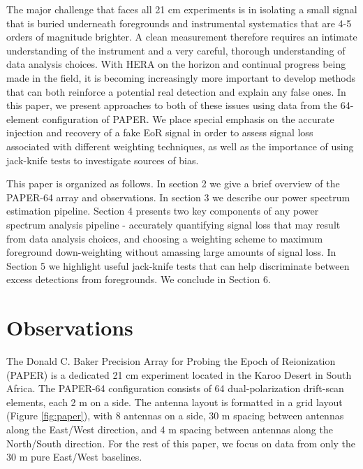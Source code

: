 \documentclass[preprint2,numberedappendix,tighten,twocolappendix]{aastex6}  %
\begin{document}
The major challenge that faces all 21 cm experiments is in isolating a small signal that is buried underneath foregrounds and instrumental systematics that are 4-5 orders of magnitude brighter. A clean measurement therefore requires an intimate understanding of the instrument and a very careful, thorough understanding of data analysis choices. With HERA on the horizon and continual progress being made in the field, it is becoming increasingly more important to develop methods that can both reinforce a potential real detection and explain any false ones. In this paper, we present approaches to both of these issues using data from the 64-element configuration of PAPER. We place special emphasis on the accurate injection and recovery of a fake EoR signal in order to assess signal loss associated with different weighting techniques, as well as the importance of using jack-knife tests to investigate sources of bias.

This paper is organized as follows. In section 2 we give a brief overview of the PAPER-64 array and observations. In section 3 we describe our power spectrum estimation pipeline. Section 4 presents two key components of any power spectrum analysis pipeline - accurately quantifying signal loss that may result from data analysis choices, and choosing a weighting scheme to maximum foreground down-weighting without amassing large amounts of signal loss. In Section 5 we highlight useful jack-knife tests that can help discriminate between excess detections from foregrounds. We conclude in Section 6.

\section{Observations}
\label{sec:Obs}

The Donald C. Baker Precision Array for Probing the Epoch of Reionization (PAPER) is a dedicated 21 cm experiment located in the Karoo Desert in South Africa. The PAPER-64 configuration consists of 64 dual-polarization drift-scan elements, each 2 m on a side. The antenna layout is formatted in a grid layout (Figure \ref{fig:paper}), with 8 antennas on a side, 30 m spacing between antennas along the East/West direction, and 4 m spacing between antennas along the North/South direction. For the rest of this paper, we focus on data from only the 30 m pure East/West baselines. 
\end{document}
